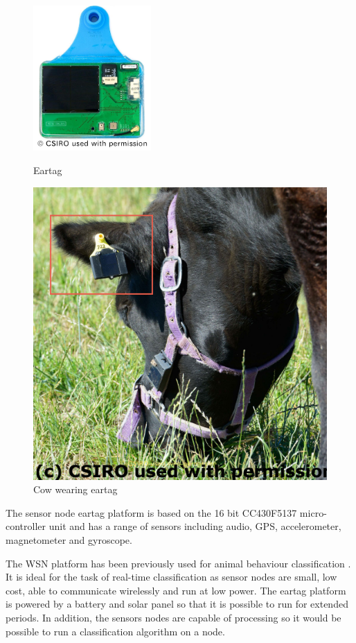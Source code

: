 \begin{figure}[ht!]
\centering
\begin{minipage}{.5\textwidth}
  \centering
  \includegraphics[width=0.4\textwidth]{images/eartag.png}
  \caption{Eartag}
  \label{eartag}
\end{minipage}%
\begin{minipage}{.5\textwidth}
  \centering
  \includegraphics[width=.5\textwidth]{images/cow.jpg}
  \caption{Cow wearing eartag}
  \label{cow}
\end{minipage}
\end{figure}

The sensor node eartag platform is based on the 16 bit CC430F5137 micro-controller unit and has a range of sensors including audio, GPS, accelerometer, magnetometer and gyroscope. 

The WSN platform has been previously used for animal behaviour classification \cite{Guo2006}. It is ideal for the task of real-time classification as sensor nodes are small, low cost, able to communicate wirelessly and run at low power. The eartag platform is powered by a battery and solar panel so that it is possible to run for extended periods. In addition, the sensors nodes are capable of processing so it would be possible to run a classification algorithm on a node. 

